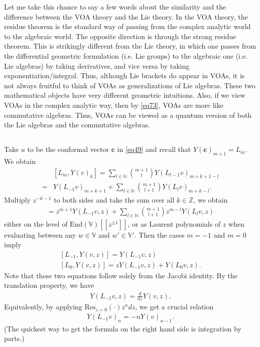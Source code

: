\documentclass[11pt,b5paper,notitlepage]{article}
\theoremstyle{definition}
\theoremstyle{plain}
\newcommand{\End}{\mathrm{End}} %
\newcommand{\Res}{\mathrm{Res}}
\newcommand{\Vbb}{\mathbb V}
\newcommand{\Nbb}{\mathbb N}
\newcommand{\Zbb}{\mathbb Z}
\newcommand{\cbf}{\mathbf c}
\numberwithin{equation}{section}
\begin{document}
Let me take this chance to say a few words about the similarity and the difference between the VOA theory and the Lie theory. In the VOA theory, the residue theorem is the standard way of passing from the complex analytic world to the algebraic world. The opposite direction is through the strong residue theorem. This is strikingly different from the Lie theory, in which one passes from the differential geometric formulation (i.e. Lie groups) to the algebraic one (i.e. Lie algebras) by taking derivatives, and vice versa by taking exponentiation/integral. Thus, although Lie brackets do appear in VOAs, it is not always fruitful to think of VOAs as generalizations of Lie algebras. These two mathematical objects have very different geometric intuitions. Also, if we view VOAs in the complex analytic way, then by \eqref{eq73}, VOAs are more like commutative algebras. Thus, VOAs can be viewed as a quantum version of both the Lie algebras and the commutative algebras.


\subsection{}

Take $u$ to be the conformal vector $\cbf$ in \eqref{eq49} and recall that $Y(\cbf)_{m+1}=L_m$. We obtain
\begin{align}
&[L_m,Y(v)_k]=\sum_{l\in\Nbb}{m+1\choose l}Y(L_{l-1}v)_{m+k+1-l}\nonumber\\	=&Y(L_{-1}v)_{m+k+1}+\sum_{l\in\Nbb}{m+1\choose l+1}Y(L_l v)_{m+k-l}.\label{eq54}
\end{align}
Multiply $z^{-k-1}$ to both sides and take the sum over all $k\in\Zbb$, we obtain
\begin{align}
[L_m,Y(v,z)]=z^{m+1}Y(L_{-1}v,z)+\sum_{l\in\Nbb}{m+1\choose l+1}z^{m-l}Y(L_l v,z)\label{eq68}
\end{align}
either on the level of $\End(\Vbb)[[z^{\pm1}]]$, or as Laurent polynomials of $z$ when evaluating between any $w\in\Vbb$ and $w'\in\Vbb'$. Then the cases $m=-1$ and $m=0$ imply
\begin{subequations}\label{eq50}
\begin{gather}
[L_{-1},Y(v,z)]=Y(L_{-1}v,z)\\
[L_0,Y(v,z)]=zY(L_{-1}v,z)+Y(L_0v,z).		
\end{gather}
\end{subequations}
Note that these two equations follow solely from the Jacobi identity. By the translation property, we have
\begin{align}
Y(L_{-1}v,z)=\frac d{dz}Y(v,z).	\label{eq51}
\end{align}
Equivalently, by applying $\Res_{z=0}(\cdot)z^ndz$, we get a crucial relation
\begin{align}
Y(L_{-1}v)_n=-nY(v)_{n-1}.\label{eq53}	
\end{align}
(The quickest way to get the formula on the right hand side is integration by parts.)
\end{document}

